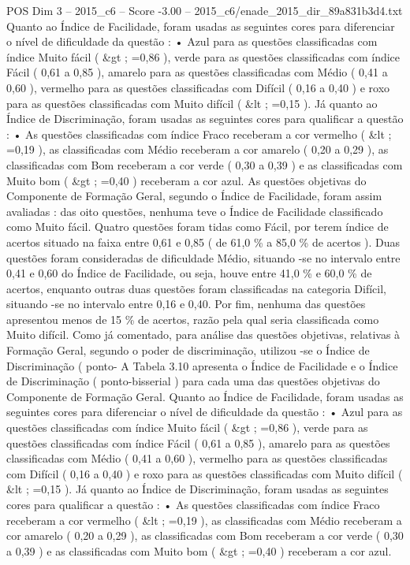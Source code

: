 \begin{textsample}{POS Dim 3 – 2015\_c6 – Score -3.00 – 2015\_c6/enade\_2015\_dir\_89a831b3d4.txt}
Quanto ao Índice de Facilidade, foram usadas as seguintes cores para diferenciar o nível de dificuldade da questão : • Azul para as questões classificadas com índice Muito fácil ( \&gt ; =0,86 ), verde para as questões classificadas com índice Fácil ( 0,61 a 0,85 ), amarelo para as questões classificadas com Médio ( 0,41 a 0,60 ), vermelho para as questões classificadas com Difícil ( 0,16 a 0,40 ) e roxo para as questões classificadas com Muito difícil ( \&lt ; =0,15 ).
Já quanto ao Índice de Discriminação, foram usadas as seguintes cores para qualificar a questão : • As questões classificadas com índice Fraco receberam a cor vermelho ( \&lt ; =0,19 ), as classificadas com Médio receberam a cor amarelo ( 0,20 a 0,29 ), as classificadas com Bom receberam a cor verde ( 0,30 a 0,39 ) e as classificadas com Muito bom ( \&gt ; =0,40 ) receberam a cor azul.
As questões objetivas do Componente de Formação Geral, segundo o Índice de Facilidade, foram assim avaliadas : das oito questões, nenhuma teve o Índice de Facilidade classificado como Muito fácil.
Quatro questões foram tidas como Fácil, por terem índice de acertos situado na faixa entre 0,61 e 0,85 ( de 61,0 \% a 85,0 \% de acertos ).
Duas questões foram consideradas de dificuldade Médio, situando -se no intervalo entre 0,41 e 0,60 do Índice de Facilidade, ou seja, houve entre 41,0 \% e 60,0 \% de acertos, enquanto outras duas questões foram classificadas na categoria Difícil, situando -se no intervalo entre 0,16 e 0,40.
Por fim, nenhuma das questões apresentou menos de 15 \% de acertos, razão pela qual seria classificada como Muito difícil.
Como já comentado, para análise das questões objetivas, relativas à Formação Geral, segundo o poder de discriminação, utilizou -se o Índice de Discriminação ( ponto- A Tabela 3.10 apresenta o Índice de Facilidade e o Índice de Discriminação ( ponto-bisserial ) para cada uma das questões objetivas do Componente de Formação Geral.
Quanto ao Índice de Facilidade, foram usadas as seguintes cores para diferenciar o nível de dificuldade da questão : • Azul para as questões classificadas com índice Muito fácil ( \&gt ; =0,86 ), verde para as questões classificadas com índice Fácil ( 0,61 a 0,85 ), amarelo para as questões classificadas com Médio ( 0,41 a 0,60 ), vermelho para as questões classificadas com Difícil ( 0,16 a 0,40 ) e roxo para as questões classificadas com Muito difícil ( \&lt ; =0,15 ).
Já quanto ao Índice de Discriminação, foram usadas as seguintes cores para qualificar a questão : • As questões classificadas com índice Fraco receberam a cor vermelho ( \&lt ; =0,19 ), as classificadas com Médio receberam a cor amarelo ( 0,20 a 0,29 ), as classificadas com Bom receberam a cor verde ( 0,30 a 0,39 ) e as classificadas com Muito bom ( \&gt ; =0,40 ) receberam a cor azul.

\end{textsample}

